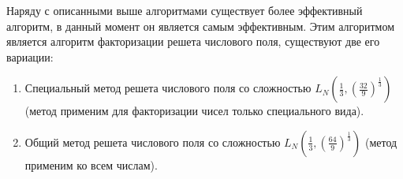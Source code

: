       Наряду с описанными выше алгоритмами существует более эффективный алгоритм, в данный момент он является самым эффективным. Этим алгоритмом является алгоритм факторизации
    решета числового поля, существуют две его вариации:
    
      \begin{enumerate}
       \item Специальный метод решета числового поля со сложностью {$L_N(\frac{1}{3}, (\frac{32}{9})^\frac{1}{3})$} 
	(метод применим для факторизации чисел только специального вида).
       \item Общий метод решета числового поля со сложностью {$L_N(\frac{1}{3}, (\frac{64}{9})^\frac{1}{3})$} 
	(метод применим ко всем числам).
      \end{enumerate}      
      
  
  

